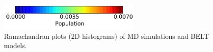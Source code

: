 \documentclass[12pt]{article}
\begin{document}
\begin{figure}

\begin{center}
\includegraphics[width=7.05cm]{figures/ALA3_rama_colorbar.pdf}
\end{center}

\caption{
Ramachandran plots (2D histograms) of MD simulations and BELT models.  
}
\label{figure:test}


\end{figure}

\newpage
\end{document}
